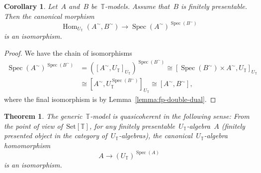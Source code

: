 \documentclass[oneside,reqno]{amsart}
\theoremstyle{definition}
\theoremstyle{plain}
\newtheorem{cor}[defn]{Corollary}
\newtheorem{thm}[defn]{Theorem}
\theoremstyle{remark}
\newcommand{\TT}{\mathbb{T}}
\DeclareMathOperator{\Spec}{Spec}
\DeclareMathOperator{\Hom}{Hom}
\newcommand{\Set}{\mathrm{Set}}
\renewcommand{\_}{\mathpunct{.}\,}
\newcommand{\?}{\,{:}\,}
\begin{document}
\begin{cor}Let~$A$ and~$B$ be~$\TT$-models. Assume that~$B$ is finitely
presentable. Then the canonical morphism
\[ \Hom_{U_\TT}(A^\sim, B^\sim) \longrightarrow \Spec(A^\sim)^{\Spec(B^\sim)}
\]
is an isomorphism.
\end{cor}

\begin{proof}We have the chain of isomorphisms
\begin{align*}
  \Spec(A^\sim)^{\Spec(B^\sim)} &=
  ([A^\sim,U_\TT]_{U_\TT})^{\Spec(B^\sim)} \cong
  [\Spec(B^\sim) \times A^\sim, U_\TT]_{U_\TT} \\
  &\cong
  [A^\sim, U_\TT^{\Spec(B^\sim)}]_{U_\TT} \cong
  [A^\sim, B^\sim],
\end{align*}
where the final isomorphism is by Lemma~\ref{lemma:fp-double-dual}.
\end{proof}


\begin{thm}The generic~$\TT$-model is \emph{quasicoherent} in the following sense:
From the point of view of~$\Set[\TT]$, for any finitely
presentable~$U_\TT$-algebra~$A$ (finitely presented object in the category
of~$U_\TT$-algebras), the canonical~$U_\TT$-algebra homomorphism
\[ A \longrightarrow (U_\TT)^{\Spec(A)} \]
is an isomorphism.
\end{thm}
\end{document}
